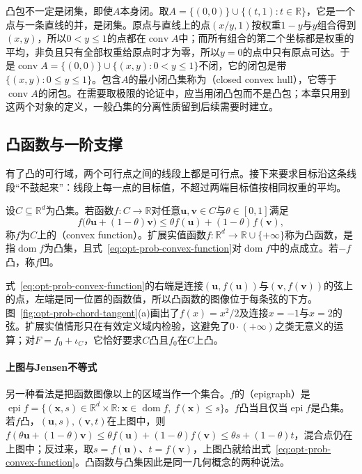凸包不一定是闭集，即使$A$本身闭。取$A=\{(0,0)\}\cup\{(t,1):t\in\mathbb R\}$，它是一个点与一条直线的并，是闭集。原点与直线上的点$(x/y,1)$按权重$1-y$与$y$组合得到$(x,y)$，所以$0<y\leq1$的点都在$\operatorname{conv}A$中；而所有组合的第二个坐标都是权重的平均，非负且只有全部权重给原点时才为零，所以$y=0$的点中只有原点可达。于是$\operatorname{conv}A=\{(0,0)\}\cup\{(x,y):0<y\leq1\}$不闭，它的闭包是带$\{(x,y):0\leq y\leq1\}$。包含$A$的最小闭凸集称为（closed convex hull），它等于$\operatorname{conv}A$的闭包。在需要取极限的论证中，应当用闭凸包而不是凸包；本章只用到这两个对象的定义，一般凸集的分离性质留到后续需要时建立。

\subsection{凸函数与一阶支撑}
\label{sec:opt-prob-convex-functions}

有了凸的可行域，两个可行点之间的线段上都是可行点。接下来要求目标沿这条线段“不鼓起来”：线段上每一点的目标值，不超过两端目标值按相同权重的平均。

\begin{definition}[凸函数]
\label{def:opt-prob-convex-function}
设$C\subseteq\mathbb R^d$为凸集。若函数$f:C\to\mathbb R$对任意$\bm u,\bm v\in C$与$\theta\in[0,1]$满足
\begin{equation}
  f\bigl(\theta\bm u+(1-\theta)\bm v\bigr)\leq\theta f(\bm u)+(1-\theta)f(\bm v),
  \label{eq:opt-prob-convex-function}
\end{equation}
称$f$为$C$上的（convex function）。扩展实值函数$f:\mathbb R^d\to\mathbb R\cup\{+\infty\}$称为凸函数，是指$\operatorname{dom}f$为凸集，且式~\eqref{eq:opt-prob-convex-function}对$\operatorname{dom}f$中的点成立。若$-f$凸，称$f$凹。
\end{definition}

式~\eqref{eq:opt-prob-convex-function}的右端是连接$(\bm u,f(\bm u))$与$(\bm v,f(\bm v))$的弦上的点，左端是同一位置的函数值，所以凸函数的图像位于每条弦的下方。图~\ref{fig:opt-prob-chord-tangent}(a)画出了$f(x)=x^2/2$及连接$x=-1$与$x=2$的弦。扩展实值情形只在有效定义域内检验，这避免了$0\cdot(+\infty)$之类无意义的运算；对$F=f_0+\iota_C$，它恰好要求$C$凸且$f_0$在$C$上凸。

\paragraph{上图与Jensen不等式}
另一种看法是把函数图像以上的区域当作一个集合。$f$的（epigraph）是$\operatorname{epi}f=\{(\bm x,s)\in\mathbb R^d\times\mathbb R:\bm x\in\operatorname{dom}f,\ f(\bm x)\leq s\}$。$f$凸当且仅当$\operatorname{epi}f$是凸集。若$f$凸，$(\bm u,s),(\bm v,t)$在上图中，则$f(\theta\bm u+(1-\theta)\bm v)\leq\theta f(\bm u)+(1-\theta)f(\bm v)\leq\theta s+(1-\theta)t$，混合点仍在上图中；反过来，取$s=f(\bm u)$、$t=f(\bm v)$，上图凸就给出式~\eqref{eq:opt-prob-convex-function}。凸函数与凸集因此是同一几何概念的两种说法。

